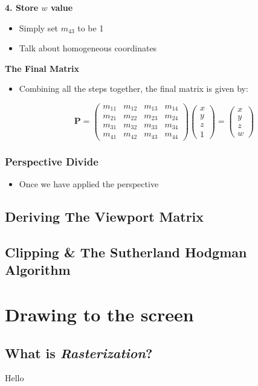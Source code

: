 \documentclass{article}
\begin{document}
\textbf{4. Store $w$ value}
\begin{itemize}
	\item Simply set $m_{43}$ to be 1
	\item Talk about homogeneous coordinates
\end{itemize}
\textbf{The Final Matrix}
\begin{itemize}
	\item Combining all the steps together, the final matrix is given by:

\[
	\textbf{P} = 	
\begin{pmatrix}
m_{11} & m_{12} & m_{13} & m_{14} \\
m_{21} & m_{22} & m_{23} & m_{24} \\
m_{31} & m_{32} & m_{33} & m_{34} \\
m_{41} & m_{42} & m_{43} & m_{44}
\end{pmatrix}%
\begin{pmatrix}
x \\ y \\ z \\ 1
\end{pmatrix}
=
\begin{pmatrix}
x\\y\\z\\w
\end{pmatrix}
\]
\end{itemize}

\subsubsection{Perspective Divide}
\begin{itemize}
	\item Once we have applied the perspective 
\end{itemize}
\subsection{Deriving The Viewport Matrix}
\subsection{Clipping \& The Sutherland Hodgman Algorithm}

\section{Drawing to the screen}
\subsection{What is \textit{Rasterization}?}
Hello
\end{document}
